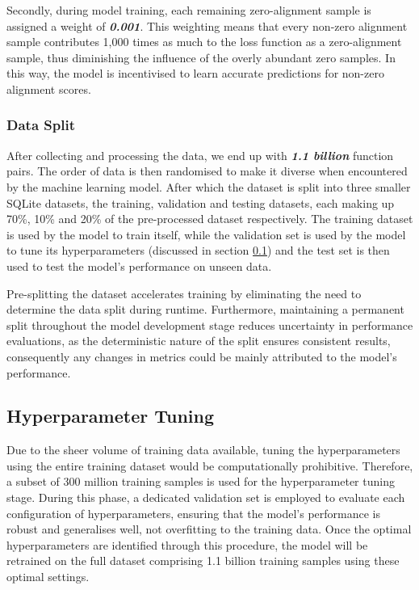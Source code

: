 Secondly, during model training, each remaining zero-alignment sample is assigned a weight of \textbf{\textit{0.001}}. This weighting means that every non-zero alignment sample contributes 1,000 times as much to the loss function as a zero-alignment sample, thus diminishing the influence of the overly abundant zero samples. In this way, the model is incentivised to learn accurate predictions for non-zero alignment scores.


\subsubsection{Data Split} \label{Design:DataSplit}
After collecting and processing the data, we end up with \textbf{\textit{1.1 billion}} function pairs. The order of data is then randomised to make it diverse when encountered by the machine learning model. After which the dataset is split into three smaller SQLite datasets, the training, validation and testing datasets, each making up 70\%, 10\% and 20\% of the pre-processed dataset respectively. The training dataset is used by the model to train itself, while the validation set is used by the model to tune its hyperparameters (discussed in section \ref{subsubsection:HyperparameterTuning}) and the test set is then used to test the model's performance on unseen data.

Pre-splitting the dataset accelerates training by eliminating the need to determine the data split during runtime. Furthermore, maintaining a permanent split throughout the model development stage reduces uncertainty in performance evaluations, as the deterministic nature of the split ensures consistent results, consequently any changes in metrics could be mainly attributed to the model's performance.


\subsection{Hyperparameter Tuning} \label{subsubsection:HyperparameterTuning}
Due to the sheer volume of training data available, tuning the hyperparameters using the entire training dataset would be computationally prohibitive. Therefore, a subset of 300 million training samples is used for the hyperparameter tuning stage. During this phase, a dedicated validation set is employed to evaluate each configuration of hyperparameters, ensuring that the model’s performance is robust and generalises well, not overfitting to the training data. Once the optimal hyperparameters are identified through this procedure, the model will be retrained on the full dataset comprising 1.1 billion training samples using these optimal settings.

